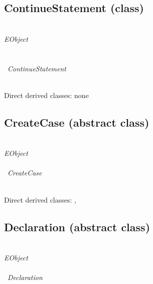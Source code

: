 \subsection{ContinueStatement (class)}\label{chiclass:ContinueStatement}
\clsdocuContinueStatement

~\\ \noindent \emph{EObject} \\
\hook~ \\
\indent\hook~ \\
\indent\indent\hook~\emph{ContinueStatement}

~\\ \noindent Direct derived classes:
none

\begin{description}



{\featdocuChiObjectposition}
\end{description}


\subsection{CreateCase (abstract class)}\label{chiclass:CreateCase}
\clsdocuCreateCase

~\\ \noindent \emph{EObject} \\
\hook~ \\
\indent\hook~\emph{CreateCase}

~\\ \noindent Direct derived classes:
, 

\begin{description}


{\featdocuChiObjectposition}
\end{description}


\subsection{Declaration (abstract class)}\label{chiclass:Declaration}
\clsdocuDeclaration

~\\ \noindent \emph{EObject} \\
\hook~ \\
\indent\hook~\emph{Declaration}

